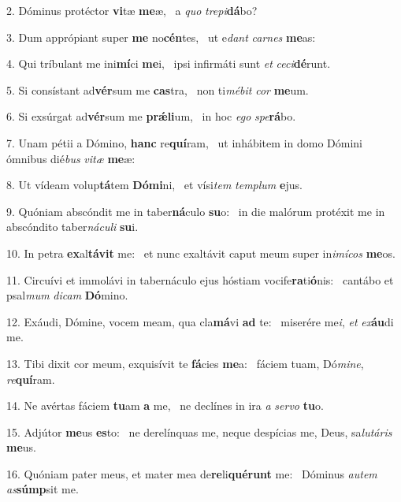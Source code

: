 2. Dóminus protéctor \textbf{vi}tæ \textbf{me}æ, \ast\  a \textit{quo} \textit{tre}\textit{pi}\textbf{dá}bo?\

3. Dum apprópiant super \textbf{me} no\textbf{cén}tes, \ast\  ut e\textit{dant} \textit{car}\textit{nes} \textbf{me}as:\

4. Qui tríbulant me ini\textbf{mí}ci \textbf{me}i, \ast\  ipsi infirmáti sunt \textit{et} \textit{ce}\textit{ci}\textbf{dé}runt.\

5. Si consístant ad\textbf{vér}sum me \textbf{cas}tra, \ast\  non ti\textit{mé}\textit{bit} \textit{cor} \textbf{me}um.\

6. Si exsúrgat ad\textbf{vér}sum me \textbf{prǽ}\textbf{li}um, \ast\  in hoc \textit{e}\textit{go} \textit{spe}\textbf{rá}bo.\

7. Unam pétii a Dómino, \textbf{hanc} re\textbf{quí}ram, \ast\  ut inhábitem in domo Dómini ómnibus dié\textit{bus} \textit{vi}\textit{tæ} \textbf{me}æ:\

8. Ut vídeam volup\textbf{tá}tem \textbf{Dó}\textbf{mi}ni, \ast\  et vísi\textit{tem} \textit{tem}\textit{plum} \textbf{e}jus.\

9. Quóniam abscóndit me in taber\textbf{ná}culo \textbf{su}o: \ast\  in die malórum protéxit me in abscóndito taber\textit{ná}\textit{cu}\textit{li} \textbf{su}i.\

10. In petra \textbf{ex}al\textbf{tá}\textbf{vit} me: \ast\  et nunc exaltávit caput meum super in\textit{i}\textit{mí}\textit{cos} \textbf{me}os.\

11. Circuívi et immolávi in tabernáculo ejus hóstiam vocife\textbf{ra}ti\textbf{ó}nis: \ast\  cantábo et psal\textit{mum} \textit{di}\textit{cam} \textbf{Dó}mino.\

12. Exáudi, Dómine, vocem meam, qua cla\textbf{má}vi \textbf{ad} te: \ast\  miserére me\textit{i}, \textit{et} \textit{ex}\textbf{áu}di me.\

13. Tibi dixit cor meum, exquisívit te \textbf{fá}cies \textbf{me}a: \ast\  fáciem tuam, Dó\textit{mi}\textit{ne}, \textit{re}\textbf{quí}ram.\

14. Ne avértas fáciem \textbf{tu}am \textbf{a} me, \ast\  ne declínes in ira \textit{a} \textit{ser}\textit{vo} \textbf{tu}o.\

15. Adjútor \textbf{me}us \textbf{es}to: \ast\  ne derelínquas me, neque despícias me, Deus, sa\textit{lu}\textit{tá}\textit{ris} \textbf{me}us.\

16. Quóniam pater meus, et mater mea de\textbf{re}li\textbf{qué}\textbf{runt} me: \ast\  Dóminus \textit{au}\textit{tem} \textit{as}\textbf{súmp}sit me.\


